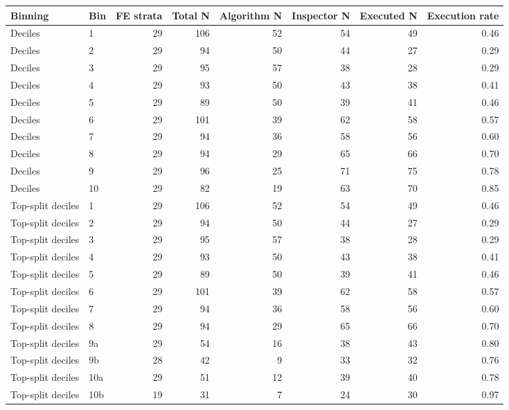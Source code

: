 \begin{tabular}{llrrrrrr}
\toprule
Binning & Bin & FE strata & Total N & Algorithm N & Inspector N & Executed N & Execution rate \\
\midrule
Deciles & 1 & 29 & 106 & 52 & 54 & 49 &  0.46 \\
Deciles & 2 & 29 & 94 & 50 & 44 & 27 &  0.29 \\
Deciles & 3 & 29 & 95 & 57 & 38 & 28 &  0.29 \\
Deciles & 4 & 29 & 93 & 50 & 43 & 38 &  0.41 \\
Deciles & 5 & 29 & 89 & 50 & 39 & 41 &  0.46 \\
Deciles & 6 & 29 & 101 & 39 & 62 & 58 &  0.57 \\
Deciles & 7 & 29 & 94 & 36 & 58 & 56 &  0.60 \\
Deciles & 8 & 29 & 94 & 29 & 65 & 66 &  0.70 \\
Deciles & 9 & 29 & 96 & 25 & 71 & 75 &  0.78 \\
Deciles & 10 & 29 & 82 & 19 & 63 & 70 &  0.85 \\
Top-split deciles & 1 & 29 & 106 & 52 & 54 & 49 &  0.46 \\
Top-split deciles & 2 & 29 & 94 & 50 & 44 & 27 &  0.29 \\
Top-split deciles & 3 & 29 & 95 & 57 & 38 & 28 &  0.29 \\
Top-split deciles & 4 & 29 & 93 & 50 & 43 & 38 &  0.41 \\
Top-split deciles & 5 & 29 & 89 & 50 & 39 & 41 &  0.46 \\
Top-split deciles & 6 & 29 & 101 & 39 & 62 & 58 &  0.57 \\
Top-split deciles & 7 & 29 & 94 & 36 & 58 & 56 &  0.60 \\
Top-split deciles & 8 & 29 & 94 & 29 & 65 & 66 &  0.70 \\
Top-split deciles & 9a & 29 & 54 & 16 & 38 & 43 &  0.80 \\
Top-split deciles & 9b & 28 & 42 & 9 & 33 & 32 &  0.76 \\
Top-split deciles & 10a & 29 & 51 & 12 & 39 & 40 &  0.78 \\
Top-split deciles & 10b & 19 & 31 & 7 & 24 & 30 &  0.97 \\
\bottomrule
\end{tabular}
